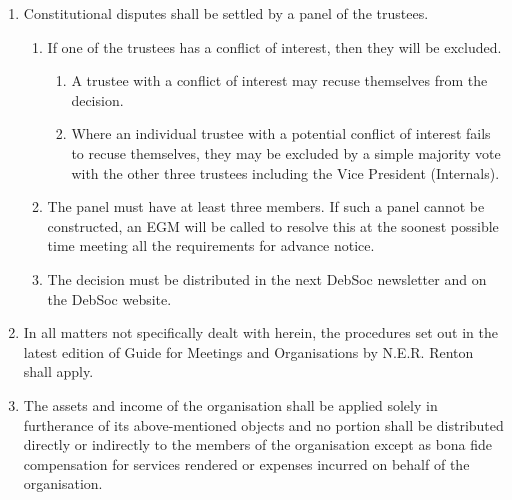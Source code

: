 \begin{enumerate}
    \item Constitutional disputes shall be settled by a panel of the trustees.
    \begin{enumerate}
        \item If one of the trustees has a conflict of interest, then they will be excluded.
        \begin{enumerate}
            \item A trustee with a conflict of interest may recuse themselves from the decision.
            \item Where an individual trustee with a potential conflict of interest fails to recuse themselves, they may be excluded by a simple majority vote with the other three trustees including the Vice President (Internals).
        \end{enumerate}
        \item The panel must have at least three members. If such a panel cannot be constructed, an EGM will be called to resolve this at the soonest possible time meeting all the requirements for advance notice.
        \item The decision must be distributed in the next DebSoc newsletter and on the DebSoc website.
    \end{enumerate}
    \item In all matters not specifically dealt with herein, the procedures set out in the latest edition of Guide for Meetings and Organisations by N.E.R. Renton shall apply.
    \item The assets and income of the organisation shall be applied solely in furtherance of its above-mentioned objects and no portion shall be distributed directly or indirectly to the members of the organisation except as bona fide compensation for services rendered or expenses incurred on behalf of the organisation.
\end{enumerate}